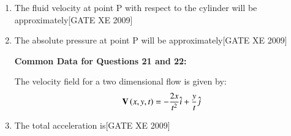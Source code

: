 \documentclass[journal,12pt,onecolumn]{IEEEtran}
\theoremstyle{remark}
\begin{document}
\begin{enumerate}
\item The fluid velocity at point P with respect to the cylinder will be approximately\hfill[GATE XE 2009]

\begin{enumerate}[leftmargin=*, itemsep=4pt]
\end{enumerate}



\item The absolute pressure at point P will be approximately\hfill[GATE XE 2009]

\begin{enumerate}[leftmargin=*, itemsep=4pt]
\end{enumerate}



\textbf{Common Data for Questions 21 and 22:}

The velocity field for a two dimensional flow is given by:
\begin{align*}
\mathbf{V}\left(x, y, t\right) = -\frac{2x}{t^2}\hat{i} + \frac{y}{t}\hat{j}
\end{align*}

\item The total acceleration is\hfill[GATE XE 2009]

\begin{enumerate}[leftmargin=*, itemsep=4pt]
\end{enumerate}




\end{enumerate}
\end{document}
